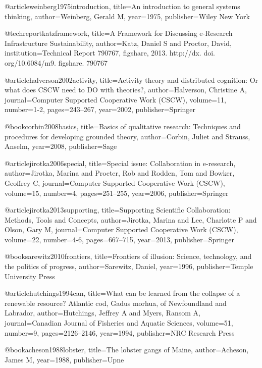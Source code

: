 @article{weinberg1975introduction,
  title={An introduction to general systems thinking},
  author={Weinberg, Gerald M},
  year={1975},
  publisher={Wiley New York}
}

@techreport{katzframework,
  title={A Framework for Discussing e-Research Infrastructure Sustainability},
  author={Katz, Daniel S and Proctor, David},
  institution={Technical Report 790767, figshare, 2013. http://dx. doi. org/10.6084/m9. figshare. 790767}
}



@article{halverson2002activity,
  title={Activity theory and distributed cognition: Or what does CSCW need to DO with theories?},
  author={Halverson, Christine A},
  journal={Computer Supported Cooperative Work (CSCW)},
  volume={11},
  number={1-2},
  pages={243--267},
  year={2002},
  publisher={Springer}
}

@book{corbin2008basics,
  title={Basics of qualitative research: Techniques and procedures for developing grounded theory},
  author={Corbin, Juliet and Strauss, Anselm},
  year={2008},
  publisher={Sage}
}


@article{jirotka2006special,
  title={Special issue: Collaboration in e-research},
  author={Jirotka, Marina and Procter, Rob and Rodden, Tom and Bowker, Geoffrey C},
  journal={Computer Supported Cooperative Work (CSCW)},
  volume={15},
  number={4},
  pages={251--255},
  year={2006},
  publisher={Springer}
}

@article{jirotka2013supporting,
  title={Supporting Scientific Collaboration: Methods, Tools and Concepts},
  author={Jirotka, Marina and Lee, Charlotte P and Olson, Gary M},
  journal={Computer Supported Cooperative Work (CSCW)},
  volume={22},
  number={4-6},
  pages={667--715},
  year={2013},
  publisher={Springer}
}


@book{sarewitz2010frontiers,
  title={Frontiers of illusion: Science, technology, and the politics of progress},
  author={Sarewitz, Daniel},
  year={1996},
  publisher={Temple University Press}
}

@article{hutchings1994can,
  title={What can be learned from the collapse of a renewable resource? Atlantic cod, Gadus morhua, of Newfoundland and Labrador},
  author={Hutchings, Jeffrey A and Myers, Ransom A},
  journal={Canadian Journal of Fisheries and Aquatic Sciences},
  volume={51},
  number={9},
  pages={2126--2146},
  year={1994},
  publisher={NRC Research Press}
}

@book{acheson1988lobster,
  title={The lobster gangs of Maine},
  author={Acheson, James M},
  year={1988},
  publisher={Upne}
}

